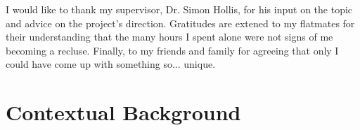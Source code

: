 \documentclass[ %
                    author={Luke Murray},
                supervisor={Dr. Simon Hollis},
                     title={Shadow Peer-to-Peer Networks},
                  subtitle={},
                    degree={MEng},
                      year={2013} ]{thesis}
\begin{document}
I would like to thank my supervisor, Dr. Simon Hollis, for his input on the topic and advice on the project's direction. Gratitudes are extened to my flatmates for their understanding that the many hours I spent alone were not signs of me becoming a recluse. Finally, to my friends and family for agreeing that only I could have come up with something so... unique.


%

\mainmatter


\chapter{Contextual Background}
\label{chap:context}
\end{document}
